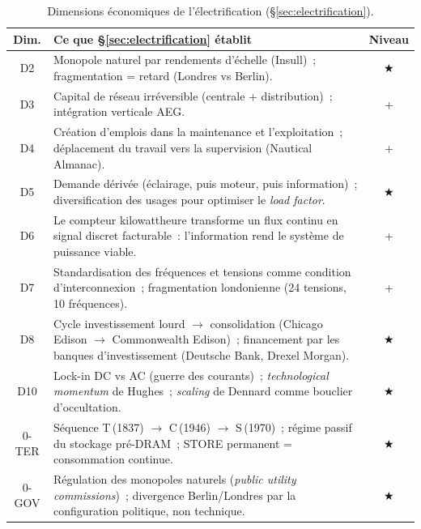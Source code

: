 \begin{table}[htbp]
\caption{Dimensions économiques de l'électrification (§\ref{sec:electrification}).}\label{tab:electrification-dimensions}
\centering\small
\renewcommand{\arraystretch}{1.15}
\begin{tabularx}{\textwidth}{@{}cXc@{}}
\toprule
\textbf{Dim.} & \textbf{Ce que §\ref{sec:electrification} établit} & \textbf{Niveau} \\
\midrule
D2 & Monopole naturel par rendements d'échelle (Insull)~; fragmentation = retard (Londres vs Berlin). & ★ \\
D3 & Capital de réseau irréversible (centrale + distribution)~; intégration verticale AEG. & + \\
D4 & Création d'emplois dans la maintenance et l'exploitation~; déplacement du travail vers la supervision (Nautical Almanac). & + \\
D5 & Demande dérivée (éclairage, puis moteur, puis information)~; diversification des usages pour optimiser le \emph{load factor}. & ★ \\
D6 & Le compteur kilowattheure transforme un flux continu en signal discret facturable~: l'information rend le système de puissance viable. & + \\
D7 & Standardisation des fréquences et tensions comme condition d'interconnexion~; fragmentation londonienne (24 tensions, 10 fréquences). & + \\
D8 & Cycle investissement lourd $\rightarrow$ consolidation (Chicago Edison $\rightarrow$ Commonwealth Edison)~; financement par les banques d'investissement (Deutsche Bank, Drexel Morgan). & ★ \\
D10 & Lock-in DC vs AC (guerre des courants)~; \emph{technological momentum} de Hughes~; \emph{scaling} de Dennard comme bouclier d'occultation. & ★ \\
\midrule
0-TER & Séquence T\,(1837) $\rightarrow$ C\,(1946) $\rightarrow$ S\,(1970)~; régime passif du stockage pré-DRAM~; STORE permanent = consommation continue. & ★ \\
0-GOV & Régulation des monopoles naturels (\emph{public utility commissions})~; divergence Berlin/Londres par la configuration politique, non technique. & ★ \\
\bottomrule
\end{tabularx}
\renewcommand{\arraystretch}{1.0}
\end{table}



%
%


